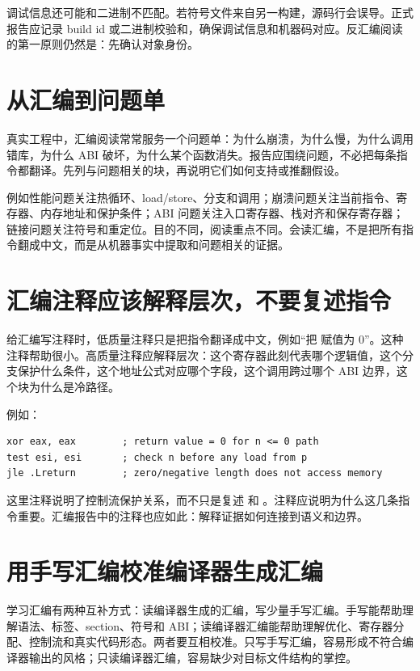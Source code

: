 调试信息还可能和二进制不匹配。若符号文件来自另一构建，源码行会误导。正式报告应记录 build id 或二进制校验和，确保调试信息和机器码对应。反汇编阅读的第一原则仍然是：先确认对象身份。

\section{从汇编到问题单}

真实工程中，汇编阅读常常服务一个问题单：为什么崩溃，为什么慢，为什么调用错库，为什么 ABI 破坏，为什么某个函数消失。报告应围绕问题，不必把每条指令都翻译。先列与问题相关的块，再说明它们如何支持或推翻假设。

例如性能问题关注热循环、load/store、分支和调用；崩溃问题关注当前指令、寄存器、内存地址和保护条件；ABI 问题关注入口寄存器、栈对齐和保存寄存器；链接问题关注符号和重定位。目的不同，阅读重点不同。会读汇编，不是把所有指令翻成中文，而是从机器事实中提取和问题相关的证据。

\section{汇编注释应该解释层次，不要复述指令}

给汇编写注释时，低质量注释只是把指令翻译成中文，例如“把  赋值为 0”。这种注释帮助很小。高质量注释应解释层次：这个寄存器此刻代表哪个逻辑值，这个分支保护什么条件，这个地址公式对应哪个字段，这个调用跨过哪个 ABI 边界，这个块为什么是冷路径。

例如：

\begin{lstlisting}
xor eax, eax        ; return value = 0 for n <= 0 path
test esi, esi       ; check n before any load from p
jle .Lreturn        ; zero/negative length does not access memory
\end{lstlisting}

这里注释说明了控制流保护关系，而不只是复述  和 。注释应说明为什么这几条指令重要。汇编报告中的注释也应如此：解释证据如何连接到语义和边界。

\section{用手写汇编校准编译器生成汇编}

学习汇编有两种互补方式：读编译器生成的汇编，写少量手写汇编。手写能帮助理解语法、标签、section、符号和 ABI；读编译器汇编能帮助理解优化、寄存器分配、控制流和真实代码形态。两者要互相校准。只写手写汇编，容易形成不符合编译器输出的风格；只读编译器汇编，容易缺少对目标文件结构的掌控。

